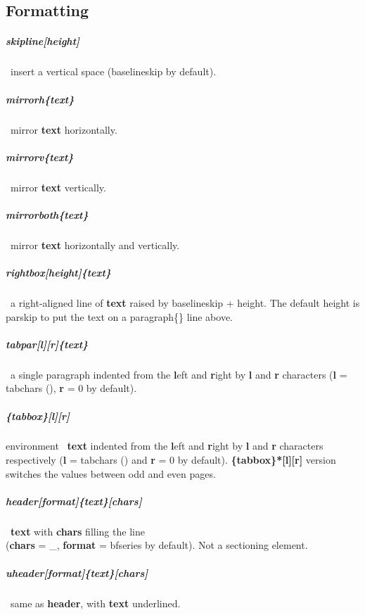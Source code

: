 \documentclass[english,12pt,openany,letterpaper]{book}
\begin{document}
\linefill[\ol{\bs\ /}]
\vspace*{-1ex}
\linefill[\so{\ }\ol{\ul{|}}\so{\ }]
\vspace*{-1ex}
\linefill[\ul{/\ \bs}]

\vfill
\break


\subsection{Formatting}

\subparagraph{\bs skipline[height]} \dash\ insert a vertical space (\bs baselineskip by default).

\skipline

\subparagraph{\bs mirrorh\{text\}} \dash\ mirror \textbf{text} horizontally.

\subparagraph{\bs mirrorv\{text\}} \dash\ mirror \textbf{text} vertically.

\subparagraph{\bs mirrorboth\{text\}} \dash\ mirror \textbf{text} horizontally and vertically.

\skipline

\subparagraph{\bs rightbox[height]\{text\}} \dash\ a right-aligned line of  \textbf{text} raised by \bs baselineskip + height. The default height is \bs parskip to put the text on a \bs paragraph\{\} line above.

\skipline

\subparagraph{\bs tabpar[l][r]\{text\}} \dash\ a single paragraph indented from the \textbf{l}eft and \textbf{r}ight by \textbf{l} and \textbf{r} characters (\textbf{l} = \bs tabchars (\tabchars), \textbf{r} = 0 by default).

\subparagraph{\{tabbox\}[l][r]} environment \dash\ \textbf{text} indented from the \textbf{l}eft and \textbf{r}ight by \textbf{l} and \textbf{r} characters respectively (\textbf{l} = \bs tabchars (\tabchars) and \textbf{r} = 0 by default). \textbf{\{tabbox\}*[l][r]} version switches the values between odd and even pages.

\skipline

\subparagraph{\bs header[format]\{text\}[chars]} \dash\ \textbf{text} with \textbf{chars} filling the line
\\(\textbf{chars} = \bs\_, \textbf{format} = \bs bfseries by default). Not a sectioning element.

\subparagraph{\bs uheader[format]\{text\}[chars]} \dash\ same as \textbf{\bs header}, with \textbf{text} underlined.

\skipline
\end{document}
